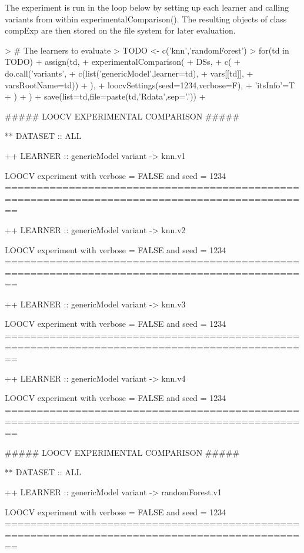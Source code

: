 \documentclass{article}
\begin{document}
The experiment is run in the loop below by setting up each learner and calling variants from within experimentalComparison(). The resulting objects of class compExp are then stored on the file system for later evaluation. 

\begin{Schunk}
\begin{Sinput}
> # The learners to evaluate
> TODO <- c('knn','randomForest')
> for(td in TODO) {
+   assign(td,
+          experimentalComparison(
+            DSs,
+            c(
+              do.call('variants',
+                      c(list('genericModel',learner=td),
+                        vars[[td]],
+                        varsRootName=td))
+            ),
+            loocvSettings(seed=1234,verbose=F),
+            'itsInfo'=T
+          )
+   )
+   save(list=td,file=paste(td,'Rdata',sep='.'))
+ }
\end{Sinput}
\begin{Soutput}
#####  LOOCV  EXPERIMENTAL COMPARISON #####

** DATASET :: ALL

++ LEARNER :: genericModel  variant ->  knn.v1 

 LOOCV experiment with verbose =  FALSE  and seed = 1234 
==============================================================================================

++ LEARNER :: genericModel  variant ->  knn.v2 

 LOOCV experiment with verbose =  FALSE  and seed = 1234 
==============================================================================================

++ LEARNER :: genericModel  variant ->  knn.v3 

 LOOCV experiment with verbose =  FALSE  and seed = 1234 
==============================================================================================

++ LEARNER :: genericModel  variant ->  knn.v4 

 LOOCV experiment with verbose =  FALSE  and seed = 1234 
==============================================================================================

#####  LOOCV  EXPERIMENTAL COMPARISON #####

** DATASET :: ALL

++ LEARNER :: genericModel  variant ->  randomForest.v1 

 LOOCV experiment with verbose =  FALSE  and seed = 1234 
==============================================================================================


\end{Soutput}
\end{Schunk}
\end{document}

